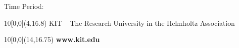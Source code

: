 \begin{titlepage}
\vspace{2cm}

\begin{center}
\large{Time Period:~~\@date}
\end{center}

\begin{textblock}{10}[0,0](4,16.8)
\tiny{KIT -- The Research University in the Helmholtz Association}
\end{textblock}

\begin{textblock}{10}[0,0](14,16.75)
\large{\textbf{www.kit.edu}}
\end{textblock}

\end{titlepage}
\makeatother
